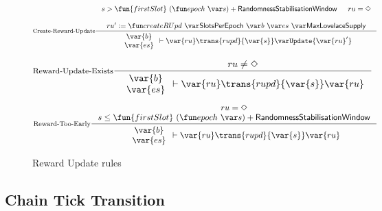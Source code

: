 \begin{figure}[ht]
  \begin{equation}\label{eq:reward-update}
    \inference[Create-Reward-Update]
    {
      s > \fun{firstSlot}~(\epoch{s}) + \RandomnessStabilisationWindow
      &
      ru = \Nothing
      \\~\\
      ru' \leteq \createRUpd{\SlotsPerEpoch}{b}{es}{\MaxLovelaceSupply}
    }
    {
      {\begin{array}{c}
         \var{b} \\
         \var{es} \\
       \end{array}}
      \vdash
      \var{ru}\trans{rupd}{\var{s}}\varUpdate{\var{ru}'}
    }
  \end{equation}

  \nextdef

  \begin{equation}\label{eq:reward-update-exists}
    \inference[Reward-Update-Exists]
    {
      ru \neq \Nothing
    }
    {
      {\begin{array}{c}
         \var{b} \\
         \var{es} \\
       \end{array}}
      \vdash
      \var{ru}\trans{rupd}{\var{s}}\var{ru}
    }
  \end{equation}

  \nextdef

  \begin{equation}\label{eq:reward-too-early}
    \inference[Reward-Too-Early]
    {
      ru = \Nothing
      \\
      s \leq \fun{firstSlot}~(\epoch{s}) + \RandomnessStabilisationWindow
    }
    {
      {\begin{array}{c}
         \var{b} \\
         \var{es} \\
       \end{array}}
      \vdash
      \var{ru}\trans{rupd}{\var{s}}\var{ru}
    }
  \end{equation}

  \caption{Reward Update rules}
  \label{fig:rules:reward-update}
\end{figure}

\subsection{Chain Tick Transition}
\label{sec:tick-trans}

